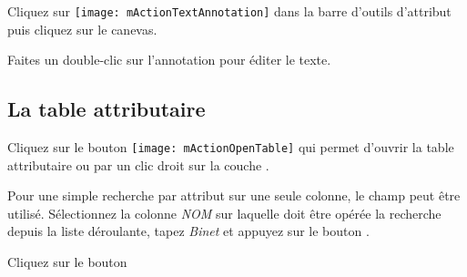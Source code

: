 Cliquez sur \texttt{[image: mActionTextAnnotation]} dans la barre d'outils d'attribut puis cliquez sur le canevas.

Faites un double-clic sur l'annotation pour éditer le texte.

\subsection{La table attributaire}

Cliquez sur le bouton \texttt{[image: mActionOpenTable]} qui permet d'ouvrir la table attributaire ou par un clic droit sur la couche . 

Pour une simple recherche par attribut sur une seule colonne, le champ  peut être utilisé. Sélectionnez la colonne \textit{NOM} sur laquelle doit être opérée la recherche depuis la liste déroulante, tapez \textit{Binet} et appuyez sur le bouton . 

Cliquez sur le bouton 